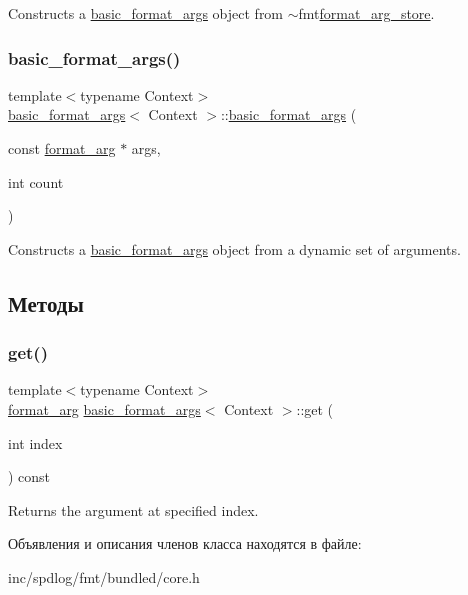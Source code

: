 Constructs a {\ttfamily \hyperlink{classbasic__format__args}{basic\+\_\+format\+\_\+args}} object from {\ttfamily $\sim$fmt\hyperlink{classformat__arg__store}{format\+\_\+arg\+\_\+store}}.  \mbox{\label{classbasic__format__args_a6d735ccb56f6c4f64ba1199f223c8a6b}} 
\subsubsection{\texorpdfstring{basic\+\_\+format\+\_\+args()}{basic\_format\_args()}\hspace{0.1cm}{\footnotesize\ttfamily [2/2]}}
{\footnotesize\ttfamily template$<$typename Context$>$ \\
\hyperlink{classbasic__format__args}{basic\+\_\+format\+\_\+args}$<$ Context $>$\+::\hyperlink{classbasic__format__args}{basic\+\_\+format\+\_\+args} (\begin{DoxyParamCaption}\item[{const \hyperlink{classbasic__format__arg}{format\+\_\+arg} $\ast$}]{args,  }\item[{int}]{count }\end{DoxyParamCaption})\hspace{0.3cm}{\ttfamily [inline]}}

Constructs a {\ttfamily \hyperlink{classbasic__format__args}{basic\+\_\+format\+\_\+args}} object from a dynamic set of arguments.  

\subsection{Методы}
\mbox{\label{classbasic__format__args_aeddde6f5786c567b2054a6cf7f6c1876}} 
\subsubsection{\texorpdfstring{get()}{get()}}
{\footnotesize\ttfamily template$<$typename Context$>$ \\
\hyperlink{classbasic__format__arg}{format\+\_\+arg} \hyperlink{classbasic__format__args}{basic\+\_\+format\+\_\+args}$<$ Context $>$\+::get (\begin{DoxyParamCaption}\item[{int}]{index }\end{DoxyParamCaption}) const\hspace{0.3cm}{\ttfamily [inline]}}

Returns the argument at specified index. 

Объявления и описания членов класса находятся в файле\+:\begin{DoxyCompactItemize}
\item 
inc/spdlog/fmt/bundled/core.\+h\end{DoxyCompactItemize}
